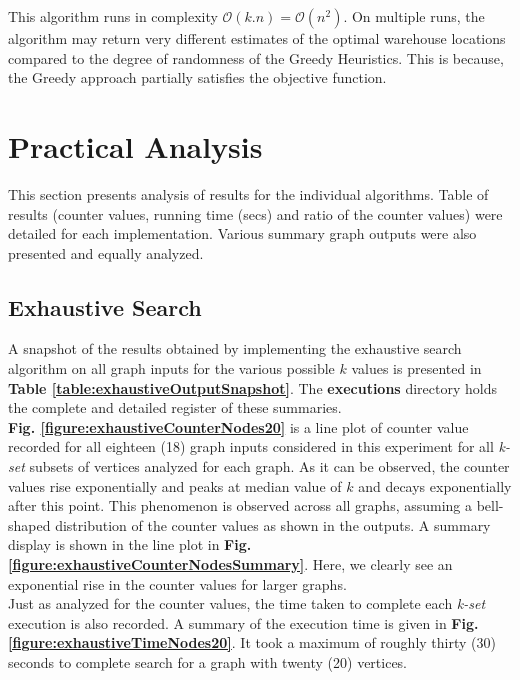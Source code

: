 \documentclass[longpaper, english, final, times]{revdetua}
\begin{document}
			This algorithm runs in complexity $\mathcal{O}(k.n)=\mathcal{O}(n^2)$. On multiple runs, the algorithm may return very different estimates of the optimal warehouse locations compared to the degree of randomness of the Greedy Heuristics. This is because, the Greedy approach partially satisfies the objective function.\\
			
		
	\section{\label{outline:practical-analysis} Practical Analysis}
		This section presents analysis of results for the individual algorithms. Table of results (counter values, running time (secs) and ratio of the counter values) were detailed for each implementation. Various summary graph outputs were also presented and equally analyzed.

		\subsection{Exhaustive Search}
			A snapshot of the results obtained by implementing the exhaustive search algorithm on all graph inputs for the various possible $k$ values is presented in \textbf{Table \ref{table:exhaustiveOutputSnapshot}}. The \textbf{executions} directory holds the complete and detailed register of these summaries.\\
			
			\textbf{Fig. \ref{figure:exhaustiveCounterNodes20}} is a line plot of counter value recorded for all eighteen (18) graph inputs considered in this experiment for all \emph{k-set} subsets of vertices analyzed for each graph. As it can be observed, the counter values rise exponentially and peaks at median value of $k$ and decays exponentially after this point. This phenomenon is observed across all graphs, assuming a bell-shaped distribution of the counter values as shown in the outputs. A summary display is shown in the line plot in \textbf{Fig. \ref{figure:exhaustiveCounterNodesSummary}}. Here, we clearly see an exponential rise in the counter values for larger graphs.\\
			
			Just as analyzed for the counter values, the time taken to complete each \emph{k-set} execution is also recorded. A summary of the execution time is given in \textbf{Fig. \ref{figure:exhaustiveTimeNodes20}}. It took a maximum of roughly thirty (30) seconds to complete search for a graph with twenty (20) vertices.\\
			
\end{document}
